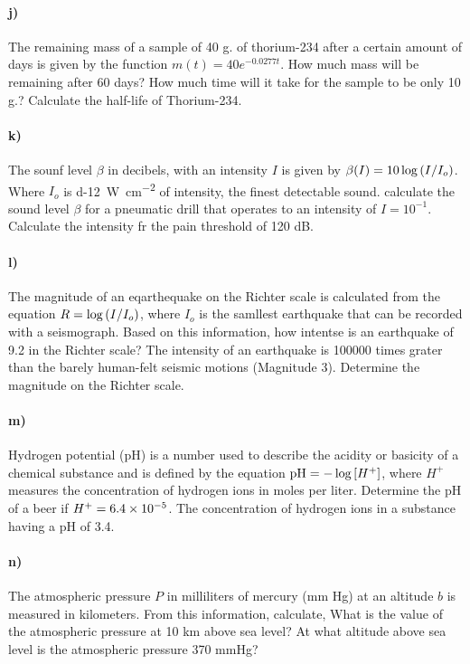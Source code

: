 \documentclass[../main.tex]{subfiles}
\begin{document}
\paragraph{j)} The remaining mass of a sample of 40 g. of thorium-234 after a certain amount of days is given by the function $m(t)=40e^{-0.0277t}$.
How much mass will be remaining after 60 days?
How much time will it take for the sample to be only 10 g.?
Calculate the half-life of Thorium-234.

\paragraph{k)} The sounf level $\beta$ in decibels, with an intensity $I$ is given by $\beta\qty(I) = 10\log\qty(I/I_o)$.
Where $I_o$ is \SI{d-12}{\watt\per\centi\meter\squared} of intensity, the finest detectable sound.
calculate the sound level $\beta$ for a pneumatic drill that operates to an intensity of $I=10^{-1}$.
Calculate the intensity fr the pain threshold of 120 dB.

\paragraph{l)} The magnitude of an eqarthequake on the Richter scale is calculated from the equation $R=\log\qty(I/I_o)$, where $I_o$ is the samllest earthquake that can be recorded with a seismograph.
Based on this information, how intentse is an earthquake of 9.2 in the Richter scale?
The intensity of an earthquake is \num{100000} times grater than the barely human-felt seismic motions (Magnitude 3).
Determine the magnitude on the Richter scale.

\paragraph{m)} Hydrogen potential (pH) is a number used to describe the acidity or basicity of a chemical substance and is defined by the equation $\mathrm{pH}=-\log\qty[H^+]$, where $H^+$ measures the concentration of hydrogen ions in moles per liter.
Determine the pH of a beer if $H^+=\num{6.4d-5}$.
The concentration of hydrogen ions in a substance having a pH of 3.4.

\paragraph{n)} The atmospheric pressure $P$ in milliliters of mercury (mm Hg) at an altitude $b$ is measured in kilometers.
From this information, calculate,
What is the value of the atmospheric pressure at 10 km above sea level?
At what altitude above sea level is the atmospheric pressure 370 mmHg?
\end{document}
